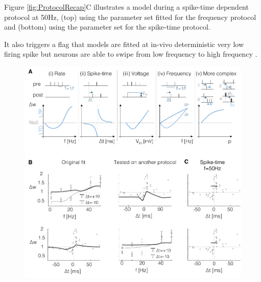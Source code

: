 Figure \ref{fig:ProtocolRecap}C illustrates a model during a spike-time dependent protocol at 50Hz, (top) using the parameter set fitted for the frequency protocol and (bottom) using the parameter set for the spike-time protocol.

It also triggers a flag that models are fitted at in-vivo deterministic very low firing spike but neurons are able to swipe from low frequency to high frequency \citep{cui_robustness_2018}. 


 \begin{figure}[H]
\centering
    \includegraphics{fig/Review/Protocols.pdf}

\end{figure}

